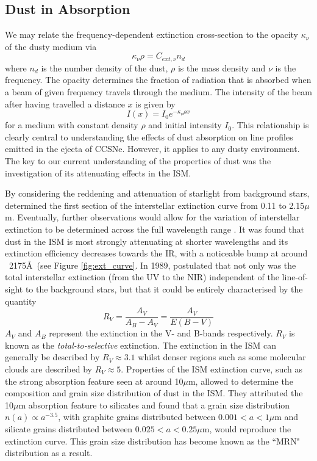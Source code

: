 \subsection{Dust in Absorption}
\label{scn:abs}
We may relate the frequency-dependent extinction cross-section to the opacity $\kappa_{\nu}$ of the dusty medium via
\begin{equation}
\kappa_{\nu} \rho = C_{ext,\nu} n_d
\end{equation}
\noindent where $n_d$ is the number density of the dust, $\rho$ is the mass density and $\nu$ is the frequency.  The opacity determines the fraction of radiation that is absorbed when a beam of given frequency travels through the medium.  The intensity of the beam after having travelled a distance $x$ is given by
\begin{equation}
I(x)=I_0 e^{-\kappa_{\nu} \rho x}
\end{equation}
 for a medium with constant density $\rho$ and initial intensity $I_0$.  This relationship is clearly central to understanding the effects of dust absorption on line profiles emitted in the ejecta of CCSNe.  However, it applies to any dusty environment.  The key to our current understanding of the properties of dust was the investigation of its attenuating effects in the ISM.  
 
By considering the reddening and attenuation of starlight from background stars,  \citet{Bless1972} determined the first section of the interstellar extinction curve from 0.11 to 2.15$\mu$m.  Eventually, further observations would allow for the variation of interstellar extinction to be determined across the full wavelength range \citep{Rieke1985}.  It was found that dust in the ISM is most strongly attenuating at shorter wavelengths and its extinction efficiency decreases towards the IR, with a noticeable bump at around ~2175\AA\ (see Figure \ref{fig:ext_curve}. In 1989, \citeauthor{Cardelli1989} postulated that not only was the total interstellar extinction (from the UV to the NIR) independent of the line-of-sight to the background stars, but that it could be entirely characterised by the quantity
\begin{equation}
R_V=\frac{A_V}{A_B-A_V}=\frac{A_V}{E(B-V)}
\end{equation}
\noindent $A_V$ and $A_B$ represent the extinction in the V- and B-bands respectively.  $R_V$ is known as the {\em total-to-selective} extinction.  The extinction in the ISM can generally be described by $R_V\approx3.1$ whilst denser regions such as some molecular clouds are described by $R_V\approx5$.  Properties of the ISM extinction curve, such as the strong absorption feature seen at around 10$\mu$m, allowed \citet*{Mathis1977} to determine the composition and grain size distribution of dust in the ISM.  They attributed the 10$\mu$m absorption feature to silicates and found that a grain size distribution $n(a) \propto a^{-3.5}$, with graphite grains distributed between $0.001<a<1\mu$m and silicate grains distributed between $0.025<a<0.25\mu$m, would reproduce the extinction curve.  This grain size distribution has become known as the ``MRN" distribution as a result.  

